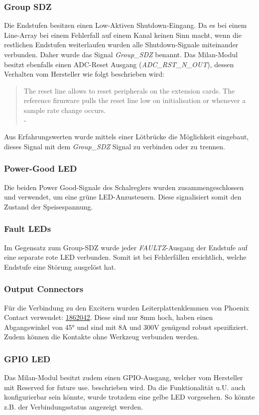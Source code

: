 \subsubsection{Group SDZ}
Die Endstufen besitzen einen Low-Aktiven Shutdown-Eingang. Da es bei einem Line-Array bei einem Fehlerfall auf einem Kanal keinen Sinn macht, wenn die restlichen Endstufen weiterlaufen wurden alle Shutdown-Signale miteinander verbunden. Daher wurde das Signal \textit{Group\_SDZ} benannt. Das Milan-Modul besitzt ebenfalls einen ADC-Reset Ausgang (\textit{ADC\_RST\_N\_OUT}), dessen Verhalten vom Hersteller wie folgt beschrieben wird:
\begin{quote}
	The reset line allows to reset peripherals on the extension cards. The reference firmware pulls the reset line low on initialisation or whenever a sample rate change occurs.\\- \cite{MT32_EVK_Datasheet}
\end{quote}
Aus Erfahrungswerten wurde mittels einer Lötbrücke die Möglichkeit eingebaut, dieses Signal mit dem \textit{Group\_SDZ} Signal zu verbinden oder zu trennen.
\subsubsection{Power-Good LED}
Die beiden Power Good-Signale des Schalreglers wurden zusammengeschlossen und verwendet, um eine grüne LED-Anzusteuern. Diese signalisiert somit den Zustand der Speisespannung.
\subsubsection{Fault LEDs}
Im Gegensatz zum Group-SDZ wurde jeder \textit{FAULTZ}-Ausgang der Endstufe auf eine separate rote LED verbunden. Somit ist bei Fehlerfällen ersichtlich, welche Endstufe eine Störung ausgelöst hat.
\subsubsection{Output Connectors}
Für die Verbindung zu den Excitern wurden Leiterplattenklemmen von Phoenix Contact verwendet: \href{https://www.phoenixcontact.com/us/products/1862042/pdf}{1862042}. Diese sind nur 8mm hoch, haben einen Abgangswinkel von 45° und sind mit 8A und 300V genügend robust spezifiziert. Zudem können die Kontakte ohne Werkzeug verbunden werden.
\subsubsection{GPIO LED}
Das Milan-Modul besitzt zudem einen GPIO-Ausgang, welcher vom Hersteller mit \textquotedbl{}Reserved for future use.\textquotedbl{} beschrieben wird. Da die Funktionalität u.U. auch konfigurierbar sein könnte, wurde trotzdem eine gelbe LED vorgesehen. So könnte z.B. der Verbindungsstatus angezeigt werden.
